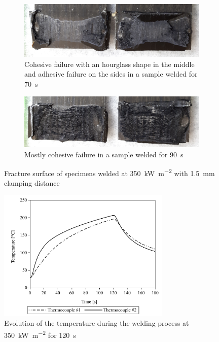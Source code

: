 \documentclass[11pt,review,times]{elsarticle}
\begin{document}
\begin{figure}[htb]
	\center
	\captionsetup{width=125mm}
	\begin{subfigure}{125mm}
		\center
		\captionsetup{width=125mm}
		\includegraphics[width=125mm]{350kW-70-10-150-1UD_crop.jpg}
		\caption{Cohesive failure with an hourglass shape in the middle and adhesive failure on the sides in a sample welded for \SI{70}{\s}}
		\label{fig:fracture_surface_70s}
	\end{subfigure}
	\begin{subfigure}{125mm}
		\center
		\captionsetup{width=125mm}
		\includegraphics[width=125mm]{350kW-90-10-150-3UD_crop.jpg}
		\caption{Mostly cohesive failure in a sample welded for \SI{90}{\s}}
		\label{fig:fracture_surface_90s}
	\end{subfigure}%
	\caption{Fracture surface of specimens welded at \SI{350}{\kW\per\square\metre} with \SI{1.5}{\mm} clamping distance \cite{Brassard2018_figshare_article1}}
	\label{fig:fracture_surface}
\end{figure}

\begin{figure}[h]
	\center
	\captionsetup{width=78mm}
	\includegraphics[width=3.25in]{temp_welding_350kw.pdf}
	\caption{Evolution of the temperature during the welding process at \SI{350}{\kilo\watt\per\square\metre} for \SI{120}{\second} \cite{Brassard2018_figshare_article1}}
	\label{fig:temp_350kW_120_10_150_3UD}
\end{figure}
\end{document}
